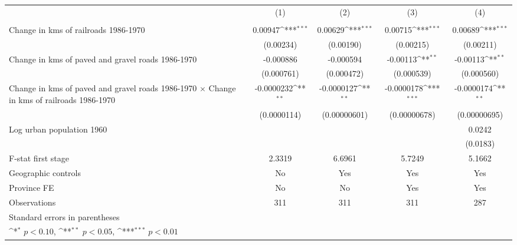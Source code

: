 {
\def\sym#1{\ifmmode^{#1}\else\(^{#1}\)\fi}
\begin{tabular}{l*{4}{c}}
\hline\hline
                &\multicolumn{1}{c}{(1)}&\multicolumn{1}{c}{(2)}&\multicolumn{1}{c}{(3)}&\multicolumn{1}{c}{(4)}\\
                &\multicolumn{1}{c}{}&\multicolumn{1}{c}{}&\multicolumn{1}{c}{}&\multicolumn{1}{c}{}\\
\hline
Change in kms of railroads 1986-1970&  0.00947\sym{***}&  0.00629\sym{***}&  0.00715\sym{***}&  0.00689\sym{***}\\
                &(0.00234)         &(0.00190)         &(0.00215)         &(0.00211)         \\
[1em]
Change in kms of paved and gravel roads 1986-1970&-0.000886         &-0.000594         & -0.00113\sym{**} & -0.00113\sym{**} \\
                &(0.000761)         &(0.000472)         &(0.000539)         &(0.000560)         \\
[1em]
Change in kms of paved and gravel roads 1986-1970 $\times$ Change in kms of railroads 1986-1970&-0.0000232\sym{**} &-0.0000127\sym{**} &-0.0000178\sym{***}&-0.0000174\sym{**} \\
                &(0.0000114)         &(0.00000601)         &(0.00000678)         &(0.00000695)         \\
[1em]
Log urban population 1960&                  &                  &                  &   0.0242         \\
                &                  &                  &                  & (0.0183)         \\
\hline
F-stat first stage&   2.3319         &   6.6961         &   5.7249         &   5.1662         \\
Geographic controls&       No         &      Yes         &      Yes         &      Yes         \\
Province FE     &       No         &       No         &      Yes         &      Yes         \\
Observations    &      311         &      311         &      311         &      287         \\
\hline\hline
\multicolumn{5}{l}{\footnotesize Standard errors in parentheses}\\
\multicolumn{5}{l}{\footnotesize \sym{*} \(p<0.10\), \sym{**} \(p<0.05\), \sym{***} \(p<0.01\)}\\
\end{tabular}
}
